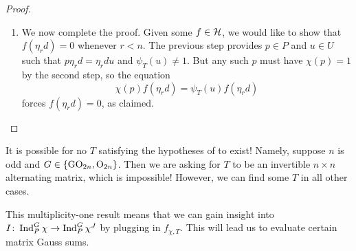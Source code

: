 \begin{proof}
\begin{enumerate}

		\item We now complete the proof. Given some $f\in\mathcal{H}$, we would like to show that $f(\eta_rd)=0$ whenever $r<n$. The previous step provides $p\in P$ and $u\in U$ such that $p\eta_rd=\eta_rdu$ and $\psi_T(u)\ne1$. But any such $p$ must have $\chi(p)=1$ by the second step, so the equation
		\[\chi(p)f(\eta_rd)=\psi_T(u)f(\eta_rd)\]
		forces $f(\eta_rd)=0$, as claimed.
		\qedhere
	\end{enumerate}
\end{proof}
\begin{remark} \label{rem:bad-orthogonal}
	It is possible for no $T$ satisfying the hypotheses of  to exist! Namely, suppose $n$ is odd and $G\in\{\mathrm{GO}_{2n},\mathrm{O}_{2n}\}$. Then we are asking for $T$ to be an invertible $n\times n$ alternating matrix, which is impossible! However, we can find some $T$ in all other cases.
\end{remark}
This multiplicity-one result means that we can gain insight into $I\colon\operatorname{Ind}_P^G\chi\to\operatorname{Ind}_P^G\chi^J$ by plugging in $f_{\chi,T}$. This will lead us to evaluate certain matrix Gauss sums.

